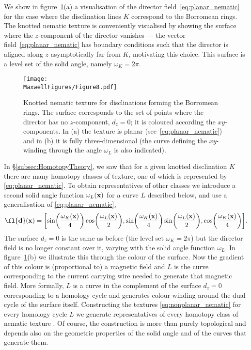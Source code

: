     We show in figure~\ref{fig:nematic}(a) a visualisation of the director field~\eqref{eq:planar_nematic} for the case where the disclination lines $K$ correspond to the Borromean rings. The knotted nematic texture is conveniently visualised by showing the surface where the $z$-component of the director vanishes --- the vector field~\eqref{eq:planar_nematic} has boundary conditions such that the director is aligned along $z$ asymptotically far from $K$, motivating this choice. This surface is a level set of the solid angle, namely $\omega_{K}=2\pi$. 
    \begin{figure}[htbp]
        \centering
        \texttt{[image: \\MaxwellFigures/Figure8.pdf]}
        \caption[Constructing knotted nematic disclinations from solid angle.]{Knotted nematic texture for disclinations forming the Borromean rings. The surface corresponds to the set of points where the director has no $z$-component, $d_z=0$; it is coloured according the $xy$-components. In (a) the texture is planar (see~\eqref{eq:planar_nematic}) and in (b) it is fully three-dimensional (the curve defining the $xy$-winding through the angle $\omega_L$ is also indicated).}
        \label{fig:nematic}
    \end{figure}

   In \S\ref{subsec:HomotopyTheory}, we saw that for a given knotted disclination $K$ there are many homotopy classes of texture, one of which is represented by \eqref{eq:planar_nematic}. To obtain representatives of other classes we introduce a second solid angle function $\omega_{L}({\bf x})$ for a curve $L$ described below, and use a generalisation of \ref{eq:planar_nematic}, 
    \begin{equation}
        \fl    {\bf d}({\bf x}) = \biggl[ \sin\biggl(\frac{\omega_{K}({\bf x})}{4}\biggr) \cos\biggl(\frac{\omega_{L}({\bf x})}{2}\biggr) , \sin\biggl(\frac{\omega_{K}({\bf x})}{4}\biggr) \sin\biggl(\frac{\omega_{L}({\bf x})}{2}\biggr) , \cos\biggl(\frac{\omega_{K}({\bf x})}{4}\biggr)  \biggr].
        \label{eq:nonplanar_nematic}
    \end{equation}
     The surface $d_z=0$ is the same as before (the level set $\omega_{K}=2\pi$) but the director field is no longer constant over it, varying with the solid angle function $\omega_{L}$. In figure~\ref{fig:nematic}(b) we illustrate this through the colour of the surface. Now the gradient of this colour is (proportional to) a magnetic field and $L$ is the curve corresponding to the current carrying wire needed to generate that magnetic field. More formally, $L$ is a curve in the complement of the surface $d_z=0$ corresponding to a homology cycle and generates colour winding around the dual cycle of the surface itself. Constructing the textures \eqref{eq:nonplanar_nematic} for every homology cycle $L$ we generate representatives of every homotopy class of nematic texture \citep{Machon2016,AlexanderBook}. Of course, the construction is more than purely topological and depends also on the geometric properties of the solid angle and of the curves that generate them. 

